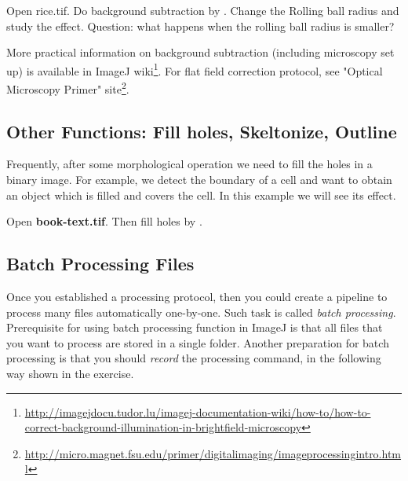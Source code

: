 \begin{indentexercise}{1}
Open rice.tif. Do background
subtraction by .
Change the Rolling ball radius and study the effect. Question: what
happens when the rolling ball radius is smaller?
\end{indentexercise}

More practical information on background subtraction (including
microscopy set up) is available in ImageJ
wiki\footnote{\url{http://imagejdocu.tudor.lu/imagej-documentation-wiki/how-to/how-to-correct-background-illumination-in-brightfield-microscopy}}. For flat field correction protocol, see "Optical
Microscopy Primer"
site\footnote{\url{http://micro.magnet.fsu.edu/primer/digitalimaging/imageprocessingintro.html}}.


\subsection{Other Functions: Fill holes, Skeltonize, Outline}

Frequently, after some morphological operation we need to fill the holes
in a binary image. For example, we detect the boundary of a cell and
want to obtain an object which is filled and covers the cell. In this
example we will see its effect.

\begin{indentexercise}{1}
Open \textbf{book-text.tif}. Then fill holes by . 
\end{indentexercise}

\clearpage
\subsection{Batch Processing Files}

Once you established a processing protocol, then you could create a
pipeline to process many files automatically one-by-one. Such task is
called \textit{batch processing}.
Prerequisite for using batch processing function in ImageJ is that all
files that you want to process are stored in a single folder. Another
preparation for batch processing is that you should
\textit{record} the processing command,
in the following way shown in the exercise.



